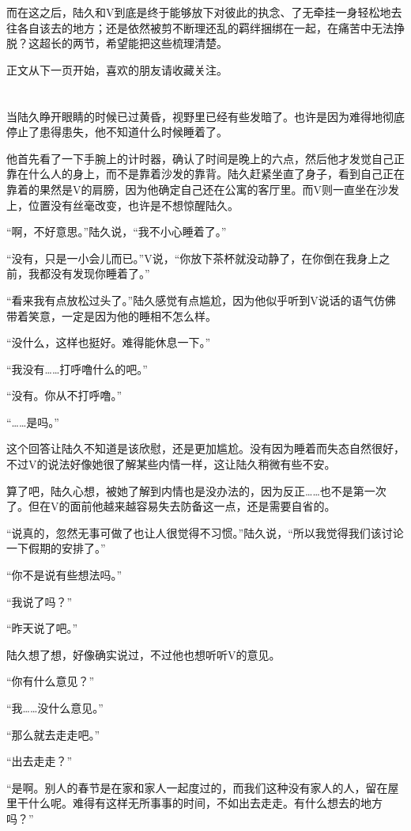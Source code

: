 而在这之后，陆久和V到底是终于能够放下对彼此的执念、了无牵挂一身轻松地去往各自该去的地方；还是依然被剪不断理还乱的羁绊捆绑在一起，在痛苦中无法挣脱？这超长的两节，希望能把这些梳理清楚。

正文从下一页开始，喜欢的朋友请收藏关注。

\lineseparator
\section*{}

当陆久睁开眼睛的时候已过黄昏，视野里已经有些发暗了。也许是因为难得地彻底停止了患得患失，他不知道什么时候睡着了。

他首先看了一下手腕上的计时器，确认了时间是晚上的六点，然后他才发觉自己正靠在什么人的身上，而不是靠着沙发的靠背。陆久赶紧坐直了身子，看到自己正在靠着的果然是V的肩膀，因为他确定自己还在公寓的客厅里。而V则一直坐在沙发上，位置没有丝毫改变，也许是不想惊醒陆久。

“啊，不好意思。”陆久说，“我不小心睡着了。”

“没有，只是一小会儿而已。”V说，“你放下茶杯就没动静了，在你倒在我身上之前，我都没有发现你睡着了。”

“看来我有点放松过头了。”陆久感觉有点尴尬，因为他似乎听到V说话的语气仿佛带着笑意，一定是因为他的睡相不怎么样。

“没什么，这样也挺好。难得能休息一下。”

“我没有……打呼噜什么的吧。”

“没有。你从不打呼噜。”

“……是吗。”

这个回答让陆久不知道是该欣慰，还是更加尴尬。没有因为睡着而失态自然很好，不过V的说法好像她很了解某些内情一样，这让陆久稍微有些不安。

算了吧，陆久心想，被她了解到内情也是没办法的，因为反正……也不是第一次了。但在V的面前他越来越容易失去防备这一点，还是需要自省的。

“说真的，忽然无事可做了也让人很觉得不习惯。”陆久说，“所以我觉得我们该讨论一下假期的安排了。”

“你不是说有些想法吗。”

“我说了吗？”

“昨天说了吧。”

陆久想了想，好像确实说过，不过他也想听听V的意见。

“你有什么意见？”

“我……没什么意见。”

“那么就去走走吧。”

“出去走走？”

“是啊。别人的春节是在家和家人一起度过的，而我们这种没有家人的人，留在屋里干什么呢。难得有这样无所事事的时间，不如出去走走。有什么想去的地方吗？”

